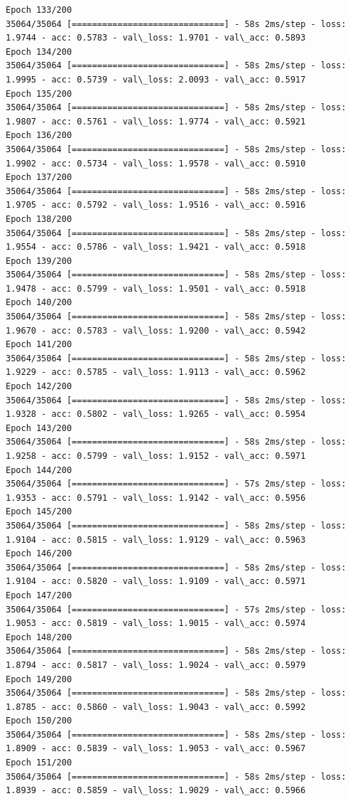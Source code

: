 \documentclass[11pt]{article}
\begin{document}
\begin{Verbatim}[commandchars=\\\{\}]
Epoch 133/200
35064/35064 [==============================] - 58s 2ms/step - loss: 1.9744 - acc: 0.5783 - val\_loss: 1.9701 - val\_acc: 0.5893
Epoch 134/200
35064/35064 [==============================] - 58s 2ms/step - loss: 1.9995 - acc: 0.5739 - val\_loss: 2.0093 - val\_acc: 0.5917
Epoch 135/200
35064/35064 [==============================] - 58s 2ms/step - loss: 1.9807 - acc: 0.5761 - val\_loss: 1.9774 - val\_acc: 0.5921
Epoch 136/200
35064/35064 [==============================] - 58s 2ms/step - loss: 1.9902 - acc: 0.5734 - val\_loss: 1.9578 - val\_acc: 0.5910
Epoch 137/200
35064/35064 [==============================] - 58s 2ms/step - loss: 1.9705 - acc: 0.5792 - val\_loss: 1.9516 - val\_acc: 0.5916
Epoch 138/200
35064/35064 [==============================] - 58s 2ms/step - loss: 1.9554 - acc: 0.5786 - val\_loss: 1.9421 - val\_acc: 0.5918
Epoch 139/200
35064/35064 [==============================] - 58s 2ms/step - loss: 1.9478 - acc: 0.5799 - val\_loss: 1.9501 - val\_acc: 0.5918
Epoch 140/200
35064/35064 [==============================] - 58s 2ms/step - loss: 1.9670 - acc: 0.5783 - val\_loss: 1.9200 - val\_acc: 0.5942
Epoch 141/200
35064/35064 [==============================] - 58s 2ms/step - loss: 1.9229 - acc: 0.5785 - val\_loss: 1.9113 - val\_acc: 0.5962
Epoch 142/200
35064/35064 [==============================] - 58s 2ms/step - loss: 1.9328 - acc: 0.5802 - val\_loss: 1.9265 - val\_acc: 0.5954
Epoch 143/200
35064/35064 [==============================] - 58s 2ms/step - loss: 1.9258 - acc: 0.5799 - val\_loss: 1.9152 - val\_acc: 0.5971
Epoch 144/200
35064/35064 [==============================] - 57s 2ms/step - loss: 1.9353 - acc: 0.5791 - val\_loss: 1.9142 - val\_acc: 0.5956
Epoch 145/200
35064/35064 [==============================] - 58s 2ms/step - loss: 1.9104 - acc: 0.5815 - val\_loss: 1.9129 - val\_acc: 0.5963
Epoch 146/200
35064/35064 [==============================] - 58s 2ms/step - loss: 1.9104 - acc: 0.5820 - val\_loss: 1.9109 - val\_acc: 0.5971
Epoch 147/200
35064/35064 [==============================] - 57s 2ms/step - loss: 1.9053 - acc: 0.5819 - val\_loss: 1.9015 - val\_acc: 0.5974
Epoch 148/200
35064/35064 [==============================] - 58s 2ms/step - loss: 1.8794 - acc: 0.5817 - val\_loss: 1.9024 - val\_acc: 0.5979
Epoch 149/200
35064/35064 [==============================] - 58s 2ms/step - loss: 1.8785 - acc: 0.5860 - val\_loss: 1.9043 - val\_acc: 0.5992
Epoch 150/200
35064/35064 [==============================] - 58s 2ms/step - loss: 1.8909 - acc: 0.5839 - val\_loss: 1.9053 - val\_acc: 0.5967
Epoch 151/200
35064/35064 [==============================] - 58s 2ms/step - loss: 1.8939 - acc: 0.5859 - val\_loss: 1.9029 - val\_acc: 0.5966

\end{Verbatim}
\end{document}
